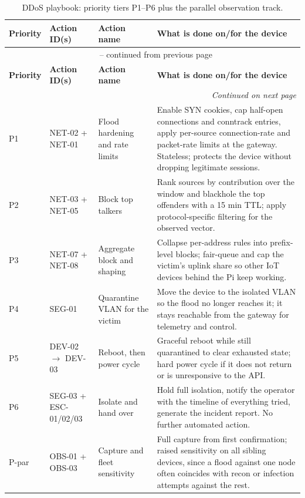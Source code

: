 \begin{longtable}{|p{}|p{}|p{}|p{}|}
\caption{DDoS playbook: priority tiers P1--P6 plus the parallel observation track.}
\label{tab:playbook_ddos}\\
\hline
\textbf{Priority} & \textbf{Action ID(s)} & \textbf{Action name} & \textbf{What is done on/for the device} \\
\hline
\endfirsthead
\multicolumn{4}{c}{\tablename\ \thetable{} -- continued from previous page}\\
\hline
\textbf{Priority} & \textbf{Action ID(s)} & \textbf{Action name} & \textbf{What is done on/for the device} \\
\hline
\endhead
\hline \multicolumn{4}{r}{\textit{Continued on next page}}\\
\endfoot
\hline
\endlastfoot
P1 & NET-02 + NET-01 & Flood hardening and rate limits & Enable SYN cookies, cap half-open connections and conntrack entries, apply per-source connection-rate and packet-rate limits at the gateway. Stateless; protects the device without dropping legitimate sessions. \\
\hline
P2 & NET-03 + NET-05 & Block top talkers & Rank sources by contribution over the window and blackhole the top offenders with a 15 min TTL; apply protocol-specific filtering for the observed vector. \\
\hline
P3 & NET-07 + NET-08 & Aggregate block and shaping & Collapse per-address rules into prefix-level blocks; fair-queue and cap the victim's uplink share so other IoT devices behind the Pi keep working. \\
\hline
P4 & SEG-01 & Quarantine VLAN for the victim & Move the device to the isolated VLAN so the flood no longer reaches it; it stays reachable from the gateway for telemetry and control. \\
\hline
P5 & DEV-02 $\rightarrow$ DEV-03 & Reboot, then power cycle & Graceful reboot while still quarantined to clear exhausted state; hard power cycle if it does not return or is unresponsive to the API. \\
\hline
P6 & SEG-03 + ESC-01/02/03 & Isolate and hand over & Hold full isolation, notify the operator with the timeline of everything tried, generate the incident report. No further automated action. \\
\hline
P-par & OBS-01 + OBS-03 & Capture and fleet sensitivity & Full capture from first confirmation; raised sensitivity on all sibling devices, since a flood against one node often coincides with recon or infection attempts against the rest. \\
\hline
\end{longtable}

